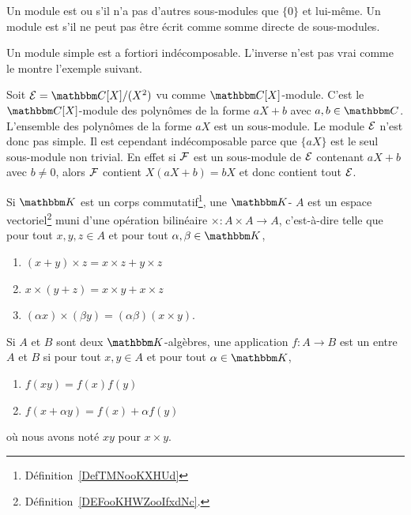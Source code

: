 \begin{definition}
    Un module est  ou  s'il n'a pas d'autres sous-modules que \( \{ 0 \}\) et lui-même. Un module est  s'il ne peut pas être écrit comme somme directe de sous-modules.
\end{definition}

Un module simple est a fortiori indécomposable. L'inverse n'est pas vrai comme le montre l'exemple suivant.

\begin{example}
    Soit \( \modE=\eC[X]/(X^2)\) vu comme \( \eC[X]\)-module. C'est le \( \eC[X]\)-module des polynômes de la forme \( aX+b\) avec \( a,b\in \eC\). L'ensemble des polynômes de la forme \( aX\) est un sous-module. Le module \( \mathcal{E}\) n'est donc pas simple. Il est cependant indécomposable parce que \( \{ aX \}\) est le seul sous-module non trivial. En effet si \( \mathcal{F}\) est un sous-module de \( \mathcal{E}\) contenant \( aX+b\) avec \( b\neq 0\), alors \( \mathcal{F}\) contient \( X(aX+b)=bX\) et donc contient tout \( \mathcal{E}\).
\end{example}

\begin{definition}   \label{DefAEbnJqI}
    Si \( \eK\) est un corps commutatif\footnote{Définition~\ref{DefTMNooKXHUd}}, une \( \eK\)- \( A\) est un espace vectoriel\footnote{Définition~\ref{DEFooKHWZooIfxdNc}.} muni d'une opération bilinéaire \( \times\colon A\times A\to A\), c'est-à-dire telle que pour tout \( x,y,z\in A\) et pour tout \( \alpha,\beta\in\eK\),
    \begin{enumerate}
        \item
            \( (x+y)\times z=x\times z+y\times z\)
        \item
            \( x\times (y+z)=x\times y+x\times z\)
        \item
            \( (\alpha x)\times (\beta y)=(\alpha\beta)(x\times y)\).
    \end{enumerate}
    Si \( A\) et \( B\) sont deux \( \eK\)-algèbres, une application \( f\colon A\to B\) est un  entre \( A\) et \( B\) si pour tout \( x,y\in A\) et pour tout \( \alpha\in \eK\),
    \begin{enumerate}
        \item
            \( f(xy)=f(x)f(y)\)
        \item
            \( f(x+\alpha y)=f(x)+\alpha f(y)\)
    \end{enumerate}
    où nous avons noté \( xy\) pour \( x\times y\).
\end{definition}

